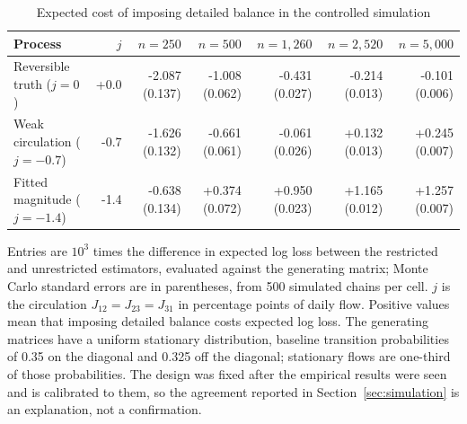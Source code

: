 \begin{table}[!htbp]\centering\footnotesize\setlength{\tabcolsep}{3pt}
\caption{Expected cost of imposing detailed balance in the controlled simulation}\label{tab:simulation}
\setlength{\tabcolsep}{3pt}\begin{tabular}{lrrrrrr}\toprule
Process & $j$ & $n=250$ & $n=500$ & $n=1{,}260$ & $n=2{,}520$ & $n=5{,}000$\\\midrule
Reversible truth ($j=0$) & +0.0 & -2.087 (0.137) & -1.008 (0.062) & -0.431 (0.027) & -0.214 (0.013) & -0.101 (0.006)\\
Weak circulation ($j=-0.7$) & -0.7 & -1.626 (0.132) & -0.661 (0.061) & -0.061 (0.026) & +0.132 (0.013) & +0.245 (0.007)\\
Fitted magnitude ($j=-1.4$) & -1.4 & -0.638 (0.134) & +0.374 (0.072) & +0.950 (0.023) & +1.165 (0.012) & +1.257 (0.007)\\
\bottomrule\end{tabular}
\par\smallskip\parbox{0.98\linewidth}{\footnotesize Entries are $10^{3}$ times the difference in expected log loss between the restricted and unrestricted estimators, evaluated against the generating matrix; Monte Carlo standard errors are in parentheses, from 500 simulated chains per cell. $j$ is the circulation $J_{12}=J_{23}=J_{31}$ in percentage points of daily flow. Positive values mean that imposing detailed balance costs expected log loss. The generating matrices have a uniform stationary distribution, baseline transition probabilities of 0.35 on the diagonal and 0.325 off the diagonal; stationary flows are one-third of those probabilities. The design was fixed after the empirical results were seen and is calibrated to them, so the agreement reported in Section~\ref{sec:simulation} is an explanation, not a confirmation.}
\end{table}
